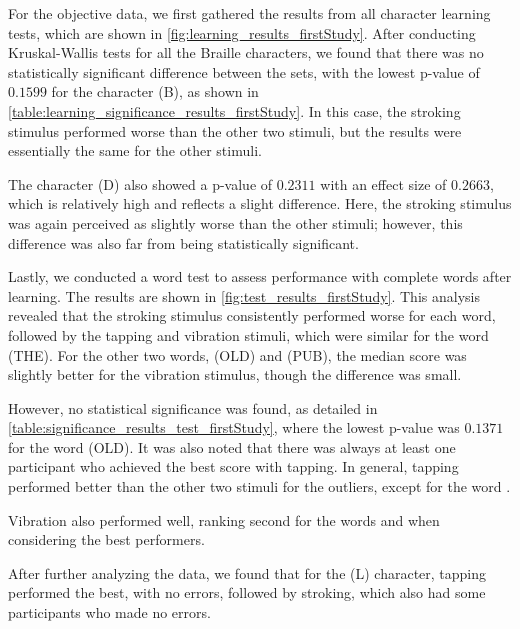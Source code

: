 
For the objective data, we first gathered the results from all character learning tests, which are shown in \autoref{fig:learning_results_firstStudy}. After conducting Kruskal-Wallis tests for all the Braille characters, we found that there was no statistically significant difference between the sets, with the lowest p-value of $0.1599$ for the character (B), as shown in \autoref{table:learning_significance_results_firstStudy}. In this case, the stroking stimulus performed worse than the other two stimuli, but the results were essentially the same for the other stimuli.

The character (D) also showed a p-value of $0.2311$ with an effect size of $0.2663$, which is relatively high and reflects a slight difference. Here, the stroking stimulus was again perceived as slightly worse than the other stimuli; however, this difference was also far from being statistically significant.


Lastly, we conducted a word test to assess performance with complete words after learning. The results are shown in \autoref{fig:test_results_firstStudy}. This analysis revealed that the stroking stimulus consistently performed worse for each word, followed by the tapping and vibration stimuli, which were similar for the word  (THE). For the other two words,  (OLD) and  (PUB), the median score was slightly better for the vibration stimulus, though the difference was small.

However, no statistical significance was found, as detailed in \autoref{table:significance_results_test_firstStudy}, where the lowest p-value was $0.1371$ for the word  (OLD). It was also noted that there was always at least one participant who achieved the best score with tapping. In general, tapping performed better than the other two stimuli for the outliers, except for the word .

Vibration also performed well, ranking second for the words  and  when considering the best performers.


After further analyzing the data, we found that for the  (L) character, tapping performed the best, with no errors, followed by stroking, which also had some participants who made no errors.

